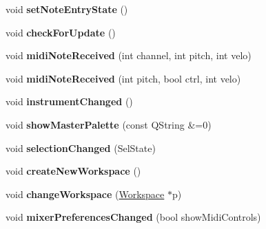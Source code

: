 \begin{DoxyCompactItemize}
void {\bfseries set\+Note\+Entry\+State} ()
\item 
\mbox{\label{class_ms_1_1_muse_score_a3ebeacfa5f692ff74b9353fff1188811}} 
void {\bfseries check\+For\+Update} ()
\item 
\mbox{\label{class_ms_1_1_muse_score_a2cba23ec6cd6092a6126a6324f547d2f}} 
void {\bfseries midi\+Note\+Received} (int channel, int pitch, int velo)
\item 
\mbox{\label{class_ms_1_1_muse_score_ad1262fe2bfe480f6b391ef6ea980eb04}} 
void {\bfseries midi\+Note\+Received} (int pitch, bool ctrl, int velo)
\item 
\mbox{\label{class_ms_1_1_muse_score_a0d6194f54eaa4beedf5d0b02cd7ae870}} 
void {\bfseries instrument\+Changed} ()
\item 
\mbox{\label{class_ms_1_1_muse_score_aeda062f57b1901def4378a9c8400c96d}} 
void {\bfseries show\+Master\+Palette} (const Q\+String \&=0)
\item 
\mbox{\label{class_ms_1_1_muse_score_a7ccdcd3f428a49d909e44e6a017bbce8}} 
void {\bfseries selection\+Changed} (Sel\+State)
\item 
\mbox{\label{class_ms_1_1_muse_score_aba8a5fa430266211b592ed9154137586}} 
void {\bfseries create\+New\+Workspace} ()
\item 
\mbox{\label{class_ms_1_1_muse_score_a234816d46dfbc48ed7504147b3501c10}} 
void {\bfseries change\+Workspace} (\hyperlink{class_ms_1_1_workspace}{Workspace} $\ast$p)
\item 
\mbox{\label{class_ms_1_1_muse_score_a8bfd953e49563120fa68fd88c62d0e22}} 
void {\bfseries mixer\+Preferences\+Changed} (bool show\+Midi\+Controls)
\end{DoxyCompactItemize}
